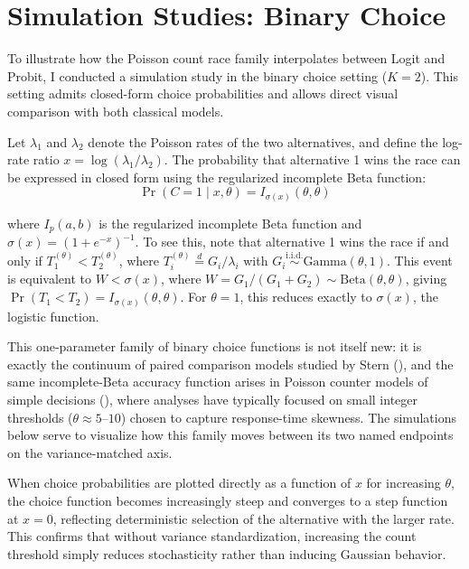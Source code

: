 \documentclass[
  man,
  floatsintext,
  longtable,
  a4paper,
  nolmodern,
  notxfonts,
  notimes,
  colorlinks=true,linkcolor=blue,citecolor=blue,urlcolor=blue]{apa7}
\begin{document}
\section{Simulation Studies: Binary
Choice}\label{sec-binary-simulations}

To illustrate how the Poisson count race family interpolates between
Logit and Probit, I conducted a simulation study in the binary choice
setting (\(K=2\)). This setting admits closed-form choice probabilities
and allows direct visual comparison with both classical models.

Let \(\lambda_1\) and \(\lambda_2\) denote the Poisson rates of the two
alternatives, and define the log-rate ratio
\(x = \log(\lambda_1/\lambda_2)\). The probability that alternative 1
wins the race can be expressed in closed form using the regularized
incomplete Beta function: \[
\Pr(C = 1 \mid x, \theta) = I_{\sigma(x)}(\theta, \theta)
\]

where \(I_p(a, b)\) is the regularized incomplete Beta function and
\(\sigma(x) = (1 + e^{-x})^{-1}\). To see this, note that alternative 1
wins the race if and only if \(T_1^{(\theta)} < T_2^{(\theta)}\), where
\(T_i^{(\theta)} \stackrel{d}{=} G_i / \lambda_i\) with
\(G_i \stackrel{\text{i.i.d.}}{\sim} \text{Gamma}(\theta, 1)\). This
event is equivalent to \(W < \sigma(x)\), where
\(W = G_1 / (G_1 + G_2) \sim \text{Beta}(\theta, \theta)\), giving
\(\Pr(T_1 < T_2) = I_{\sigma(x)}(\theta, \theta)\). For \(\theta = 1\),
this reduces exactly to \(\sigma(x)\), the logistic function.

This one-parameter family of binary choice functions is not itself new:
it is exactly the continuum of paired comparison models studied by Stern
(), and the same
incomplete-Beta accuracy function arises in Poisson counter models of
simple decisions
(), where analyses have typically focused on small integer
thresholds (\(\theta \approx 5\text{–}10\)) chosen to capture
response-time skewness. The simulations below serve to visualize how
this family moves between its two named endpoints on the
variance-matched axis.

When choice probabilities are plotted directly as a function of \(x\)
for increasing \(\theta\), the choice function becomes increasingly
steep and converges to a step function at \(x = 0\), reflecting
deterministic selection of the alternative with the larger rate. This
confirms that without variance standardization, increasing the count
threshold simply reduces stochasticity rather than inducing Gaussian
behavior.
\end{document}
